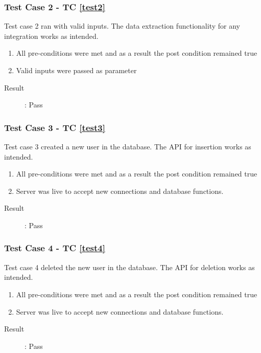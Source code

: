 \documentclass{article}
\begin{document}
\subsubsection{Test Case 2 - TC \ref{test2}}
Test case 2 ran with valid inputs.
The data extraction functionality for any integration works as intended.
\begin{enumerate}
	\item All pre-conditions were met and as a result the post condition remained true
	\item Valid inputs were passed as parameter 
\end{enumerate}

\begin{description}
	\item [Result]: Pass 
\end{description}

\subsubsection{Test Case 3 - TC \ref{test3}}
Test case 3 created a new user in the database.
The API for insertion works as intended.
\begin{enumerate}
	\item All pre-conditions were met and as a result the post condition remained true
	\item Server was live to accept new connections and database functions.
\end{enumerate}

\begin{description}
	\item [Result]: Pass 
\end{description}

\subsubsection{Test Case 4 - TC \ref{test4}}
Test case 4 deleted the new user in the database.
The API for deletion works as intended.
\begin{enumerate}
	\item All pre-conditions were met and as a result the post condition remained true
	\item Server was live to accept new connections and database functions.
\end{enumerate}

\begin{description}
	\item [Result]: Pass 
\end{description}
\end{document}
